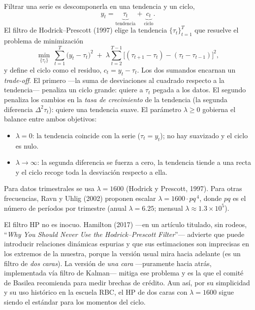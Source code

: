 \documentclass[11pt,a4paper]{report}
\newcounter{tcbrem}[section]
\renewcommand{\thetcbrem}{\thesection.\arabic{tcbrem}}
\newenvironment{remark}{%
  \refstepcounter{tcbrem}%
  \begin{tcolorbox}[remarkstyle, title={Observación~\thetcbrem}]}%
{\end{tcolorbox}}
\begin{document}
Filtrar una serie es descomponerla en una tendencia y un ciclo,
\begin{equation}
y_t=\underbrace{\tau_t}_{\text{tendencia}}+\underbrace{c_t}_{\text{ciclo}}.
\label{eq:hpdecomp}
\end{equation}
El filtro de Hodrick--Prescott (1997) elige la tendencia $\{\tau_t\}_{t=1}^{T}$ que
resuelve el problema de minimización
\begin{equation}
\min_{\{\tau_t\}}\ \sum_{t=1}^{T}\big(y_t-\tau_t\big)^2
\;+\;\lambda\sum_{t=2}^{T-1}\big[(\tau_{t+1}-\tau_t)-(\tau_t-\tau_{t-1})\big]^2,
\label{eq:hp}
\end{equation}
y define el ciclo como el residuo, $c_t=y_t-\tau_t$. Los dos sumandos encarnan un
\emph{trade-off}. El primero ---la suma de desviaciones al cuadrado respecto a la
tendencia--- penaliza un ciclo grande: quiere a $\tau_t$ pegada a los datos. El
segundo penaliza los cambios en la \emph{tasa de crecimiento} de la tendencia
(la segunda diferencia $\Delta^2\tau_t$): quiere una tendencia suave. El parámetro
$\lambda\ge0$ gobierna el balance entre ambos objetivos:
\begin{itemize}[nosep,leftmargin=1.4em]
\item $\lambda=0$: la tendencia coincide con la serie ($\tau_t=y_t$); no hay
  suavizado y el ciclo es nulo.
\item $\lambda\to\infty$: la segunda diferencia se fuerza a cero, la tendencia
  tiende a una recta y el ciclo recoge toda la desviación respecto a ella.
\end{itemize}
Para datos trimestrales se usa $\lambda=1600$ (Hodrick y Prescott, 1997). Para
otras frecuencias, Ravn y Uhlig (2002) proponen escalar $\lambda=1600\cdot pq^{\,4}$,
donde $pq$ es el número de períodos por trimestre (anual $\lambda=6.25$; mensual
$\lambda\approx1.3\times10^{5}$).

\begin{remark}
El filtro HP no es inocuo. Hamilton (2017) ---en un artículo titulado, sin
rodeos, ``\emph{Why You Should Never Use the Hodrick--Prescott Filter}''---
advierte que puede introducir relaciones dinámicas espurias y que sus estimaciones
son imprecisas en los extremos de la muestra, porque la versión usual mira hacia
adelante (es un filtro de \emph{dos caras}). La versión de \emph{una cara}
---puramente hacia atrás, implementada vía filtro de Kalman--- mitiga ese problema
y es la que el comité de Basilea recomienda para medir brechas de crédito. Aun
así, por su simplicidad y su uso histórico en la escuela RBC, el HP de dos caras
con $\lambda=1600$ sigue siendo el estándar para los momentos del ciclo.
\end{remark}
\end{document}
